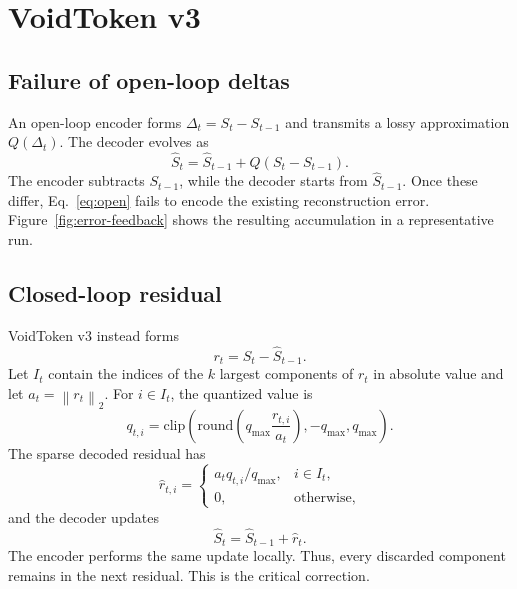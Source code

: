 \documentclass[10pt]{article}
\newcommand{\norm}[1]{\left\lVert #1 \right\rVert_2}
\begin{document}
\section{VoidToken v3}

\subsection{Failure of open-loop deltas}

An open-loop encoder forms $\Delta_t=S_t-S_{t-1}$ and transmits a lossy
approximation $Q(\Delta_t)$. The decoder evolves as
\begin{equation}
  \widehat{S}_t=\widehat{S}_{t-1}+Q(S_t-S_{t-1}).
  \label{eq:open}
\end{equation}
The encoder subtracts $S_{t-1}$, while the decoder starts from
$\widehat{S}_{t-1}$. Once these differ, Eq.~\eqref{eq:open} fails to encode the
existing reconstruction error. Figure~\ref{fig:error-feedback} shows the
resulting accumulation in a representative run.

\subsection{Closed-loop residual}

VoidToken v3 instead forms
\begin{equation}
  r_t = S_t-\widehat{S}_{t-1}.
  \label{eq:residual}
\end{equation}
Let $I_t$ contain the indices of the $k$ largest components of $r_t$ in
absolute value and let $a_t=\norm{r_t}$. For $i\in I_t$, the quantized value is
\begin{equation}
  q_{t,i}=\mathrm{clip}\!\left(
    \mathrm{round}\!\left(q_{\max}\frac{r_{t,i}}{a_t}\right),
    -q_{\max},q_{\max}\right).
  \label{eq:quant}
\end{equation}
The sparse decoded residual has
\begin{equation}
  \widehat{r}_{t,i}=
  \begin{cases}
    a_tq_{t,i}/q_{\max},&i\in I_t,\\
    0,&\text{otherwise},
  \end{cases}
\end{equation}
and the decoder updates
\begin{equation}
  \widehat{S}_t=\widehat{S}_{t-1}+\widehat{r}_t.
  \label{eq:decode}
\end{equation}
The encoder performs the same update locally. Thus, every discarded component
remains in the next residual. This is the critical correction.
\end{document}
